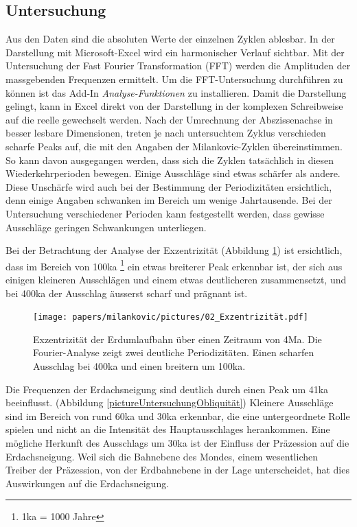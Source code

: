 \subsection{Untersuchung
\label{milankovic:subsection:Untersuchung}}
Aus den Daten sind die absoluten Werte der einzelnen Zyklen ablesbar.
In der Darstellung mit Microsoft-Excel wird ein harmonischer Verlauf sichtbar.
Mit der Untersuchung der Fast Fourier Transformation (FFT) werden die Amplituden der massgebenden Frequenzen ermittelt.
Um die FFT-Untersuchung durchführen zu können ist das Add-In
{\em Analyse-Funktionen}
zu installieren.
Damit die Darstellung gelingt, kann in Excel direkt von der Darstellung in der komplexen Schreibweise auf die reelle gewechselt werden.
Nach der Umrechnung der Abszissenachse in besser lesbare Dimensionen, treten je nach untersuchtem Zyklus verschieden scharfe Peaks auf, die mit den Angaben der Milankovic-Zyklen übereinstimmen.
So kann davon ausgegangen werden, dass sich die Zyklen tatsächlich in diesen Wiederkehrperioden bewegen.
Einige Ausschläge sind etwas schärfer als andere.
Diese Unschärfe wird auch bei der Bestimmung der Periodizitäten ersichtlich, denn einige Angaben schwanken im Bereich um wenige Jahrtausende.
Bei der Untersuchung verschiedener Perioden kann festgestellt werden, dass gewisse Ausschläge geringen Schwankungen unterliegen.

Bei der Betrachtung der Analyse der Exzentrizität
(Abbildung \ref{pictureUntersuchungExzentrizität})
ist ersichtlich, dass im Bereich von 100ka
\footnote{1ka = 1000 Jahre}
ein etwas breiterer Peak erkennbar ist, der sich aus einigen kleineren Ausschlägen und einem etwas deutlicheren zusammensetzt, und bei 400ka der Ausschlag äusserst scharf und prägnant ist.

\begin{figure}
	\centering
	\texttt{[image: papers/milankovic/pictures/02\_Exzentrizität.pdf]}
	\caption{Exzentrizität der Erdumlaufbahn über einen Zeitraum von 4Ma.
	Die Fourier-Analyse zeigt zwei deutliche Periodizitäten. 
	Einen scharfen Ausschlag bei 400ka und einen breitern um 100ka.
		\label{pictureUntersuchungExzentrizität}}
\end{figure}

Die Frequenzen der Erdachsneigung sind deutlich durch einen Peak um 41ka beeinflusst.
	(Abbildung \ref{pictureUntersuchungObliquität})
Kleinere Ausschläge sind im Bereich von rund 60ka und 30ka erkennbar, die eine untergeordnete Rolle spielen und nicht an die Intensität des Hauptausschlages herankommen.
Eine mögliche Herkunft des Ausschlags um 30ka ist der Einfluss der Präzession auf die Erdachsneigung. 
Weil sich die Bahnebene des Mondes, einem wesentlichen Treiber der Präzession, von der Erdbahnebene in der Lage unterscheidet, hat dies Auswirkungen auf die Erdachsneigung.

